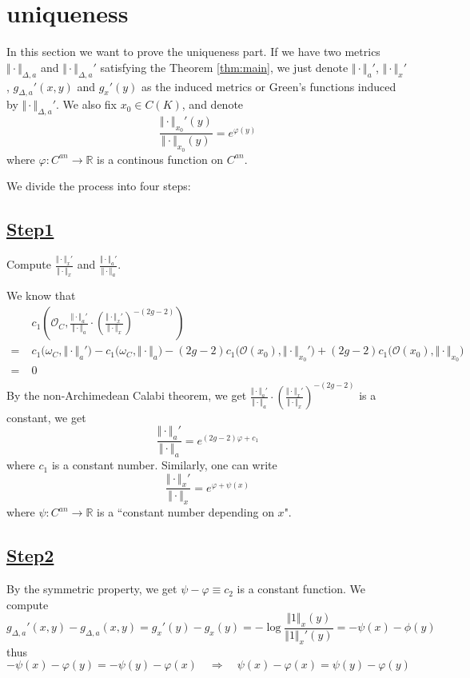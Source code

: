 \documentclass[reqno,11pt]{amsart}
\numberwithin{equation}{section}
\theoremstyle{plain}
\theoremstyle{plain}
\numberwithin{equation}{section}
\theoremstyle{remark}
\newcommand{\norm}[1]{\Vert{#1}\Vert}
\begin{document}
\section{uniqueness}
In this section we want to prove the uniqueness part. If we have two metrics $\norm{\cdot}_{\Delta,a}$ and $\norm{\cdot}_{\Delta,a}'$ satisfying the Theorem \ref{thm:main}, we just denote $\norm{\cdot}_a'$, $\norm{\cdot}_x'$, $g_{\Delta,a}'(x,y)$ and $g_x'(y)$ as the induced metrics or Green's functions induced by $\norm{\cdot}_{\Delta,a}'$. We also fix $x_0 \in C(K)$, and denote 
$$\frac{\norm{\cdot}_{x_0}'(y)}{\norm{\cdot}_{x_0}(y)}=e^{\varphi(y)}$$
where $\varphi:C^{an} \longrightarrow \mathbb{R}$ is a continous function on $C^{an}$.

We divide the process into four steps:
\subsection*{\underline{Step1}}
Compute $\displaystyle\frac{\norm{\cdot}_x'}{\norm{\cdot}_x}$ and $\displaystyle \frac{\norm{\cdot}_a'}{\norm{\cdot}_a}$.

We know that 
\begin{equation*}
\begin{aligned}
&c_1\left(\mathcal{O}_C,\frac{\norm{\cdot}_a'}{\norm{\cdot}_a} \cdot \left(\frac{\norm{\cdot}_x'}{\norm{\cdot}_x} \right)^{-(2g-2)}\right)\\
  =\;&c_1\Big(\omega_C,\norm{\cdot}_a'\Big)-c_1\Big(\omega_C,\norm{\cdot}_a\Big)-(2g-2)c_1\Big(\mathcal{O}(x_0),\norm{\cdot}_{x_0}'\Big)+ (2g-2)c_1\Big(\mathcal{O}(x_0),\norm{\cdot}_{x_0}\Big) \\
    =\;& 0  \\ 
\end{aligned}
\end{equation*}
By the non-Archimedean Calabi theorem, we get $\displaystyle \frac{\norm{\cdot}_a'}{\norm{\cdot}_a} \cdot \left(\frac{\norm{\cdot}_x'}{\norm{\cdot}_x} \right)^{-(2g-2)}$ is a constant, we get
$$\frac{\norm{\cdot}_a'}{\norm{\cdot}_a}=e^{(2g-2)\varphi+c_1}$$
where $c_1$ is a constant number. Similarly, one can write
$$\frac{\norm{\cdot}_x'}{\norm{\cdot}_x}=e^{\varphi+\psi(x)}$$
where $\psi:C^{an} \longrightarrow \mathbb{R}$ is a ``constant number depending on $x$".
\subsection*{\underline{Step2}}
By the symmetric property, we get $\psi-\varphi\equiv c_2$ is a constant function. We compute
$$
  g_{\Delta,a}'(x,y)-g_{\Delta,a}(x,y)= g_x'(y)-g_x(y)   =-\log \frac{\norm{1}_x(y)}{\norm{1}_x'(y)}=-\psi(x)-\phi(y)
$$
thus
$$-\psi(x)-\varphi(y)=-\psi(y)-\varphi(x) \quad\Longrightarrow\quad \psi(x)-\varphi(x)=\psi(y)-\varphi(y)$$
\end{document}
